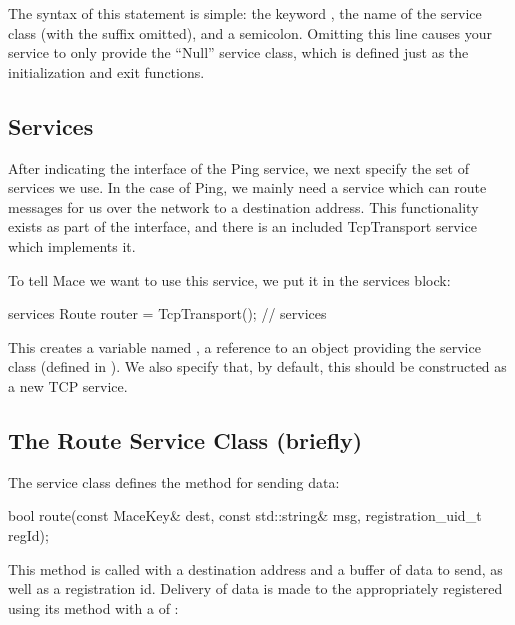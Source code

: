 The syntax of this statement is simple: the keyword
, the name of the service class (with the suffix
 omitted), and a semicolon.  Omitting this
line causes your service to only provide the ``Null'' service class,
which is defined just as the initialization and exit functions.


\subsection{Services}
\label{sec:services}

After indicating the interface of the Ping service, we next specify the set of
services we use.  In the case of Ping, we mainly need a service which can
route messages for us over the network to a destination address.  This
functionality exists as part of the  interface,
and there is an included TcpTransport service which implements it.

To tell Mace we want to use this service, we put it in the services block:

\begin{programlisting}
services {
  Route router = TcpTransport();
} // services
\end{programlisting}

This creates a variable named , a reference to an
object providing the  service class (defined in
).  We also specify that, by default,
this should be constructed as a new TCP service.


\subsection{The Route Service Class (briefly)}
\label{sec:route-service-overview}

The  service class defines the 
method for sending data:

\begin{programlisting}
bool route(const MaceKey& dest, const std::string& msg, registration_uid_t regId);
\end{programlisting}

This method is called with a destination address and a buffer of data
to send, as well as a registration id.  Delivery of data is made to
the appropriately registered  using its
 method with a  of
:

